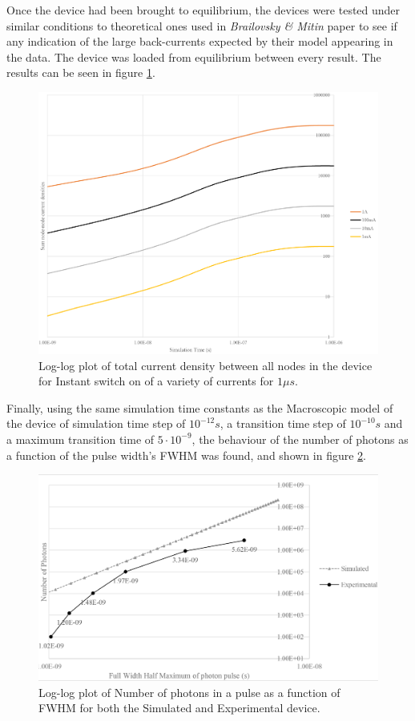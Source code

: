 \documentclass[titlepage]{article}
\begin{document}
Once the device had been brought to equilibrium, the devices were tested under similar conditions to theoretical ones used in \textit{Brailovsky \& Mitin} paper to see if any indication of the large back-currents expected by their model appearing in the data. The device was loaded from equilibrium between every result. The results can be seen in figure \ref{res:Mic:G3}.\\
\begin{figure}[H]
	\centering
	\includegraphics[scale=0.6]{Figures/FINAL_JSIM}
	\caption{Log-log plot of total current density between all nodes in the device for Instant switch on of a variety of currents for $1\mu s$.\label{res:Mic:G3}}
\end{figure}
Finally, using the same simulation time constants as the Macroscopic model of the device of simulation time step of $10^{-12}s$, a transition time step of $10^{-10}s$ and a maximum transition time of $5\cdot 10^{-9}$, the behaviour of the number of photons as a function of the pulse width's FWHM was found, and shown in figure \ref{res:Mic:G4}.\\
\begin{figure}[H]
	\centering
	\includegraphics[scale=0.7]{Figures/Device_Rad}
	\caption{Log-log plot of Number of photons in a pulse as a function of FWHM for both the Simulated and Experimental device.\label{res:Mic:G4}}
\end{figure}
\end{document}
